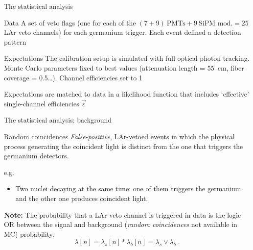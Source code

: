 \documentclass[10pt,aspectratio=169]{beamer}
\renewcommand{\epsilon}{\varepsilon}
\begin{document}
\begin{frame}{The statistical analysis}
  \begin{exampleblock}{Data}
    A set of veto flags (one for each of the $(7 + 9)~\text{PMTs} +
    9~\text{SiPM mod.} = 25$ LAr veto channels) for each germanium trigger.
    Each event defined a detection \alert{pattern}
  \end{exampleblock}

  \begin{exampleblock}{Expectations}
    The calibration setup is simulated with \alert{full optical photon
    tracking}. Monte Carlo parameters fixed to best values (attenuation length
    = 55~cm, fiber coverage = 0.5\ldots). Channel efficiencies set to 1
  \end{exampleblock}

  Expectations are matched to data in a \alert{likelihood} function that
  includes `effective' single-channel efficiencies $\vec{\epsilon}$
\end{frame}
\begin{frame}{The statistical analysis: background}
  \begin{exampleblock}{Random coincidences}
    \emph{False-positive}, LAr-vetoed events in which the physical process
    generating the coincident light is distinct from the one that triggers the
    germanium detectors.
  \end{exampleblock}

  e.g.
  \begin{itemize}
    \item Two nuclei decaying at the same time: one of them triggers the
      germanium and the other one produces coincident light.
  \end{itemize}

  {\small
    \textbf{Note:} The probability that a LAr veto channel is triggered in data
    is the logic OR between the signal and background (\emph{random coincidences}
    not available in MC) probability.
    \[
      \lambda[n] = \lambda_s[n] * \lambda_b[n] = \lambda_s \vee \lambda_b \;.
    \]%
  }
\end{frame}
\end{document}
